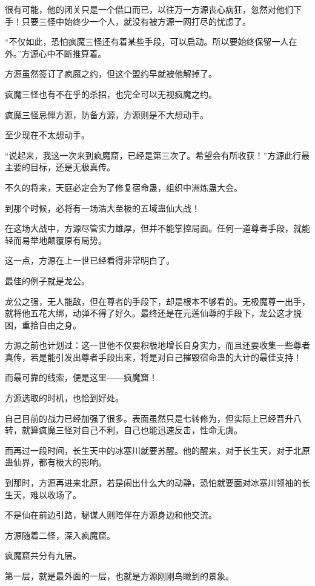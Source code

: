 \begin{this_body}
很有可能，他的闭关只是一个借口而已，以往万一方源丧心病狂，忽然对他们下手！只要三怪中始终少一个人，就没有被方源一网打尽的忧虑了。

“不仅如此，恐怕疯魔三怪还有着某些手段，可以启动。所以要始终保留一人在外。”方源心中不断推算着。

方源虽然签订了疯魔之约，但这个盟约早就被他解掉了。

疯魔三怪也有不在乎的杀招，也完全可以无视疯魔之约。

疯魔三怪忌惮方源，防备方源，方源则是不大想动手。

至少现在不太想动手。

“说起来，我这一次来到疯魔窟，已经是第三次了。希望会有所收获！”方源此行最主要的目标，还是无极真传。

不久的将来，天庭必定会为了修复宿命蛊，组织中洲炼蛊大会。

到那个时候，必将有一场浩大至极的五域蛊仙大战！

在这场大战中，方源尽管实力雄厚，但并不能掌控局面。任何一道尊者手段，就能轻而易举地颠覆原有局势。

这一点，方源在上一世已经看得非常明白了。

最佳的例子就是龙公。

龙公之强，无人能敌，但在尊者的手段下，却是根本不够看的。无极魔尊一出手，就将他五花大绑，动弹不得了好久。最终还是在元莲仙尊的手段下，龙公这才脱困，重拾自由之身。

方源之前也计划过：这一世他不仅要积极地增长自身实力，而且还要收集一些尊者真传，若是能引发出尊者手段出来，将是对自己摧毁宿命蛊的大计的最佳支持！

而最可靠的线索，便是这里——疯魔窟！

方源选取的时机，也恰到好处。

自己目前的战力已经加强了很多。表面虽然只是七转修为，但实际上已经晋升八转，就算疯魔三怪对自己不利，自己也能迅速反击，性命无虞。

而再过一段时间，长生天中的冰塞川就要苏醒。他的醒来，对于长生天，对于北原蛊仙界，都有极大的影响。

到那时，方源再进来北原，若是闹出什么大的动静，恐怕就要面对冰塞川领袖的长生天，难以收场了。

不是仙在前边引路，秘谋人则陪伴在方源身边和他交流。

方源随着二怪，深入疯魔窟。

疯魔窟共分有九层。

第一层，就是最外面的一层，也就是方源刚刚鸟瞰到的景象。


\end{this_body}
